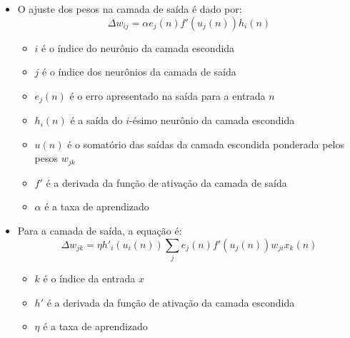\documentclass{article}
\begin{document}
\begin{itemize}
\begin{itemize}
\begin{enumerate}
			\end{enumerate}			
			\item O ajuste dos pesos na camada de saída é dado por:
			$$ \Delta w_{ij} = \alpha e_j(n)f'(u_j(n))h_i(n)$$
			\begin{itemize}
				\item $i$ é o índice do neurônio da camada escondida
				\item $j$ é o índice dos neurônios da camada de saída
				\item $e_j(n)$ é o erro apresentado na saída para a entrada $n$
				\item $h_i(n)$ é a saída do $i$-ésimo neurônio da camada escondida
				\item $u(n)$ é o somatório das saídas da camada escondida ponderada pelos pesos $w_{jk}$
				\item $f'$ é a derivada da função de ativação da camada de saída
				\item $\alpha$ é a taxa de aprendizado
			\end{itemize}
			\item Para a camada de saída, a equação é:
			$$ \Delta w_{jk} = \eta h'_i(u_i(n)) \sum_j e_j(n) f'(u_j(n))w_{ji}x_k(n)$$
			\begin{itemize}
				\item $k$ é o índice da entrada $x$
				\item $h'$ é a derivada da função de ativação da camada escondida
				\item $\eta$ é a taxa de aprendizado
			\end{itemize}
		\end{itemize}				
	\end{itemize}
\end{document}
